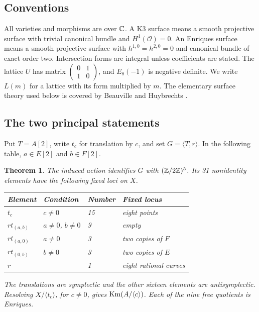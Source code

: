 \documentclass[11pt]{amsart}
\newtheorem{theorem}{Theorem}[section]
\theoremstyle{definition}
\begin{document}
\subsection{Conventions}
All varieties and morphisms are over $\mathbb C$. A K3 surface means a smooth
projective surface with trivial canonical bundle and $H^1(\mathcal O)=0$.
An Enriques surface means a smooth projective surface with
$h^{1,0}=h^{2,0}=0$ and canonical bundle of exact order two. Intersection
forms are integral unless coefficients are stated. The lattice $U$ has
matrix $\left(\begin{smallmatrix}0&1\\1&0\end{smallmatrix}\right)$, and
$E_8(-1)$ is negative definite. We write $L(m)$ for a lattice with its
form multiplied by $m$. The elementary surface theory used below is
covered by Beauville \cite{Beauville} and Huybrechts \cite{Huybrechts}.

\subsection{The two principal statements}
Put $T=A[2]$, write $t_c$ for translation by $c$, and set
$G=\langle T,r\rangle$. In the following table, $a\in E[2]$ and
$b\in F[2]$.

\begin{theorem}\label{thm:classification}
The induced action identifies $G$ with $(\mathbb Z/2\mathbb Z)^5$. Its 31 nonidentity
elements have the following fixed loci on $X$.
\begin{center}
\begin{tabular}{@{}llll@{}}\toprule
Element & Condition & Number & Fixed locus\\\midrule
$t_c$ & $c\ne0$ & 15 & eight points\\
$rt_{(a,b)}$ & $a\ne0$, $b\ne0$ & 9 & empty\\
$rt_{(a,0)}$ & $a\ne0$ & 3 & two copies of $F$\\
$rt_{(0,b)}$ & $b\ne0$ & 3 & two copies of $E$\\
$r$ & & 1 & eight rational curves\\\bottomrule
\end{tabular}
\end{center}
The translations are symplectic and the other sixteen elements are
antisymplectic. Resolving $X/\langle t_c\rangle$, for $c\ne0$, gives
$\operatorname{Km}(A/\langle c\rangle)$. Each of the nine free quotients is Enriques.
\end{theorem}
\end{document}
